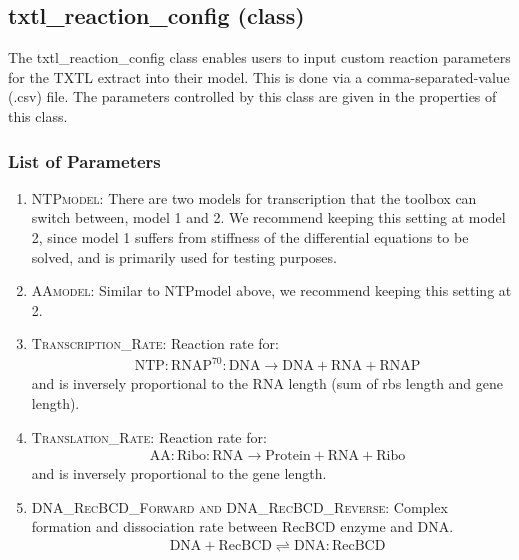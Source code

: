 \documentclass[english]{report}
\begin{document}
		\subsection*{txtl\_reaction\_config (class)}
		The txtl\_reaction\_config class enables users to input custom reaction parameters for the TXTL extract into their model. This is done via a comma-separated-value (.csv) file. The parameters controlled by this class are given in the properties of this class. 
		\subsubsection*{List of Parameters}
			\begin{enumerate}
			\item \textsc{NTPmodel}: 
			There are two models for transcription that the toolbox can switch between, model 1 and 2. We recommend keeping this setting at model 2, since model 1 suffers from stiffness of the differential equations to be solved, and is primarily used for testing purposes. 
        	\item \textsc{AAmodel}: 
        	Similar to NTPmodel above, we recommend keeping this setting at 2. 
        	\item \textsc{Transcription\_Rate}:
        	Reaction rate for: \\
        	\begin{align}
        	& \mathrm{NTP:RNAP^{70}:DNA} \rightarrow \mathrm{DNA} + \mathrm{RNA} + \mathrm{RNAP} 
        	\end{align}
        	and is inversely proportional to the RNA length (sum of rbs length and gene length). 
        	
        	\item \textsc{Translation\_Rate}: Reaction rate for: \\
        	\begin{align}
        	& \mathrm{AA:Ribo:RNA}  \rightarrow \mathrm{Protein} + \mathrm{RNA} + \mathrm{Ribo}
        	\end{align}
        	and is inversely proportional to the gene length. 
        	\item \textsc{DNA\_RecBCD\_Forward and DNA\_RecBCD\_Reverse}:
        	Complex formation and dissociation rate between RecBCD enzyme and DNA.        	
        	\begin{align}
        	& \mathrm{DNA} + \mathrm{RecBCD}  \rightleftharpoons \mathrm{DNA:RecBCD}
        	\end{align}
        	

\end{enumerate}
\end{document}
